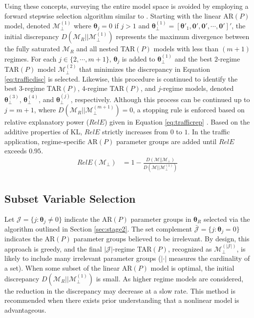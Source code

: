 Using these concepts, surveying the entire model space is avoided by employing a forward stepwise selection algorithm similar to \cite{Piironen2015}. Starting with the linear AR$(P)$ model, denoted $\mathcal{M}^{(1)}_{\perp}$ where $\bm{\theta}_j=0$ if $j>1$ and $\bm{\theta}^{(1)}_\perp=[\bm{\theta}'_1,\bm{0}',\bm{0}',\cdots,\bm{0}']'$, the initial discrepancy $D(\mathcal{M}_{R}||\mathcal{M}^{(1)}_{\perp})$ represents the maximum divergence between the fully saturated $\mathcal{M}_R$ and all nested TAR$(P)$ models with less than $(m+1)$ regimes. For each $j \in \{2,\cdots,m+1\}$, $\bm{\theta}_j$ is added to $\bm{\theta}^{(1)}_\perp$ and the best $2$-regime TAR$(P)$ model $\mathcal{M}^{(2)}_\perp$ that minimizes the discrepancy in Equation \ref{eq:trafficdisc} is selected. Likewise, this procedure is continued to identify the best $3$-regime TAR$(P)$, $4$-regime TAR$(P)$, and $j$-regime models, denoted $\bm{\theta}^{(3)}_\perp$, $\bm{\theta}^{(4)}_\perp$, and $\bm{\theta}^{(j)}_\perp$, respectively. Although this process can be continued up to $j=m+1$, where 
$D(\mathcal{M}_{R}||\mathcal{M}^{(m+1)}_{\perp})=0$, a stopping rule is enforced based on relative explanatory power ($RelE$) given in Equation \ref{eq:trafficrep} \citep{Dupuis2003}. Based on the additive properties of KL, $RelE$ strictly increases from $0$ to $1$. In the traffic application, regime-specific AR$(P)$ parameter groups are added until $RelE$ exceeds $0.95$.
\begin{equation}
\label{eq:trafficrep}
\begin{split}
RelE(\mathcal{M}_\perp)&=1-\frac{D(\mathcal{M}||\mathcal{M}_\perp)}{D(\mathcal{M}||\mathcal{M}_\perp^{(1)})}\\
\end{split}
\end{equation}


\subsection{Subset Variable Selection}
\label{sec:stage3}

Let $\mathcal{J}=\{j: \bm{\theta}_j \neq 0\}$ indicate the AR$(P)$ parameter groups in $\bm{\theta}_R$ selected via the algorithm outlined in Section \ref{sec:stage2}. The set complement $\bar{\mathcal{J}}=\{j: \bm{\theta}_j = 0\}$ indicates the AR$(P)$ parameter groups believed to be irrelevant. By design, this approach is greedy, and the final $|\mathcal{J}|$-regime TAR$(P)$, recognized as $\mathcal{M}^{(|\mathcal{J}|)}_\perp$, is likely to include many irrelevant parameter groups ($|\cdot|$ measures the cardinality of a set). When some subset of the linear AR$(P)$ model is optimal, the initial discrepancy  $D(\mathcal{M}_{R}||\mathcal{M}^{(1)}_{\perp})$ is small. As higher regime models are considered, the reduction in the discrepancy may decrease at a slow rate. This method is recommended when there exists prior understanding that a nonlinear model is advantageous.

